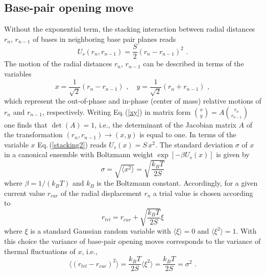 \documentclass[12pt,masters,final]{UTRGVthesis}
\begin{document}
\subsection{Base-pair opening move}{\label{bopmv}}
Without the exponential term, the stacking interaction between radial distances $r_n$, $r_{n-1}$
of bases in neighboring base pair planes reads
%
\begin{equation} \label{stacking2}
    U_s(r_n,r_{n-1}) = \frac{S}{2} \left(r_n - r_{n-1} \right)^2 \, \, .  
\end{equation}
%
The motion of the radial distances $r_n$, $r_{n-1}$ can be described in terms of the variables
%
\begin{equation} \label{xy}
  x = \frac{1}{\sqrt{2}} \left(r_n - r_{n-1}\right) \, \, , \quad
  y = \frac{1}{\sqrt{2}} \left(r_n + r_{n-1}\right) \, \, ,
\end{equation}
%
which represent the out-of-phase and in-phase (center of mass) relative motions of
$r_n$ and $r_{n-1}$, respectively. Writing Eq.\,(\ref{xy}) in matrix form 
$ {x \choose y} = A {r_n \choose r_{n-1}}$ one finds that $\det(A)=1$, i.e., the
determinant of the Jacobian matrix $A$ of the transformation $(r_n, r_{n-1}) \to (x,y)$ is equal
to one. In terms of the variable $x$ Eq.\,(\ref{stacking2}) reads $U_s(x) = S \, x^2$.
The standard deviation $\sigma$ of $x$ in a canonical ensemble with Boltzmann weight
$\exp\left[-\beta U_s(x) \right]$ is given by
%
\begin{equation} \label{sd}
  \sigma = \sqrt{\langle x^2 \rangle} = \sqrt{\frac{k_B T}{2 S}}
\end{equation}
%
where $\beta = 1 / (k_B T)$ and $k_B$ is the Boltzmann constant.
%
Accordingly, for a given current value $r_{cur}$ of the radial displacement $r_n$ a trial value
is chosen according to
%
\begin{equation} \label{rtl}
r_{trl} = r_{cur} + \sqrt{\frac{k_BT}{2S}} \xi
\end{equation}
%
where $\xi$ is a standard Gaussian random variable with $\langle \xi \rangle = 0$ and
$\langle \xi^2 \rangle = 1$. With this choice the variance of base-pair opening moves
corresponds to the variance of thermal fluctuations of $x$, i.e.,
%
\begin{equation} \label{var} 
  \langle \left(r_{trl} - r_{cur} \right)^2 \rangle = \frac{k_{B}T}{2S} \langle \xi^2 \rangle =
  \frac{k_{B}T}{2S} = \sigma^2 \, \, .
\end{equation}\\
\end{document}
